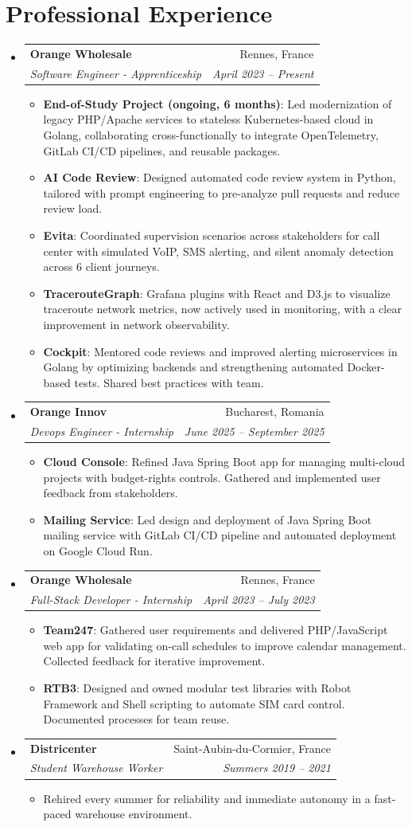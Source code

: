 \documentclass[letterpaper,11pt]{article}
\makeatletter
\newcommand{\resumeItem}[2]{
  \item\small{
    \begin{minipage}[t]{\dimexpr\linewidth-2em\relax}
    \textbf{#1}{: #2 \vspace{-2pt}}
    \end{minipage}
  }
}
\newcommand{\resumeItemPlain}[1]{
  \item\small{
    {#1 \vspace{-2pt}}
  }
}
\newcommand{\resumeSubheading}[4]{
  \vspace{-1pt}\item
    \begin{tabular*}{0.97\textwidth}[t]{l@{\extracolsep{\fill}}r}
      \textbf{#1} & #2 \\
      \textit{\small #3} & \textit{\small #4} \\
    \end{tabular*}\vspace{-6pt}
}
\newcommand{\resumeSubHeadingListStart}{\begin{itemize}[leftmargin=*]}
\newcommand{\resumeSubHeadingListEnd}{\end{itemize}}
\newcommand{\resumeItemListStart}{\begin{itemize}}
\newcommand{\resumeItemListEnd}{\end{itemize}\vspace{-6pt}}
\makeatother
\begin{document}
\section{Professional Experience}
  \resumeSubHeadingListStart
    \resumeSubheading
      {Orange Wholesale}{Rennes, France}
      {Software Engineer - Apprenticeship}{April 2023 -- Present}
      \resumeItemListStart
        \resumeItem{End-of-Study Project (ongoing, 6 months)}{Led modernization of legacy PHP/Apache services to stateless Kubernetes-based cloud in Golang, collaborating cross-functionally to integrate OpenTelemetry, GitLab CI/CD pipelines, and reusable packages.}
        \resumeItem{AI Code Review}{Designed automated code review system in Python, tailored with prompt engineering to pre-analyze pull requests and reduce review load.}
        \resumeItem{Evita}{Coordinated supervision scenarios across stakeholders for call center with simulated VoIP, SMS alerting, and silent anomaly detection across 6 client journeys.}
        \resumeItem{TracerouteGraph}{Grafana plugins with React and D3.js to visualize traceroute network metrics, now actively used in monitoring, with a clear improvement in network observability.}
        \resumeItem{Cockpit}{Mentored code reviews and improved alerting microservices in Golang by optimizing backends and strengthening automated Docker-based tests. Shared best practices with team.}
      \resumeItemListEnd
    \resumeSubheading
      {Orange Innov}{Bucharest, Romania}
      {Devops Engineer - Internship}{June 2025 -- September 2025}
      \resumeItemListStart
        \resumeItem{Cloud Console}{Refined Java Spring Boot app for managing multi-cloud projects with budget-rights controls. Gathered and implemented user feedback from stakeholders.}
        \resumeItem{Mailing Service}{Led design and deployment of Java Spring Boot mailing service with GitLab CI/CD pipeline and automated deployment on Google Cloud Run.}
    \resumeItemListEnd
        \resumeSubheading
      {Orange Wholesale}{Rennes, France}
      {Full-Stack Developer - Internship}{April 2023 -- July 2023}
      \resumeItemListStart
        \resumeItem{Team247}{Gathered user requirements and delivered PHP/JavaScript web app for validating on-call schedules to improve calendar management. Collected feedback for iterative improvement.}
        \resumeItem{RTB3}{Designed and owned modular test libraries with Robot Framework and Shell scripting to automate SIM card control. Documented processes for team reuse.}
      \resumeItemListEnd
    \resumeSubheading
      {Districenter}{Saint-Aubin-du-Cormier, France}
      {Student Warehouse Worker}{Summers 2019 -- 2021}
      \resumeItemListStart
        \resumeItemPlain{Rehired every summer for reliability and immediate autonomy in a fast-paced warehouse environment.}
      \resumeItemListEnd
  \resumeSubHeadingListEnd
\end{document}
